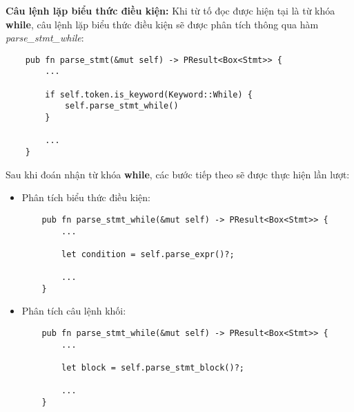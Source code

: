\textbf{Câu lệnh lặp biểu thức điều kiện:} Khi từ tố đọc được hiện tại là từ khóa \textbf{while}, câu lệnh lặp biểu thức điều kiện sẽ được phân tích thông qua hàm \\\textit{parse\_stmt\_while}:
\begin{lstlisting}
    pub fn parse_stmt(&mut self) -> PResult<Box<Stmt>> {
        ...    

        if self.token.is_keyword(Keyword::While) {
            self.parse_stmt_while()
        } 
        
        ...
    }
\end{lstlisting}
Sau khi đoán nhận từ khóa \textbf{while}, các bước tiếp theo sẽ được thực hiện lần lượt:
\begin{itemize}
    \item Phân tích biểu thức điều kiện:
\begin{lstlisting}
    pub fn parse_stmt_while(&mut self) -> PResult<Box<Stmt>> {
        ...

        let condition = self.parse_expr()?;

        ...
    }
\end{lstlisting}
    \item Phân tích câu lệnh khối:
\begin{lstlisting}
    pub fn parse_stmt_while(&mut self) -> PResult<Box<Stmt>> {
        ...

        let block = self.parse_stmt_block()?;

        ...
    }
\end{lstlisting}
\end{itemize}

